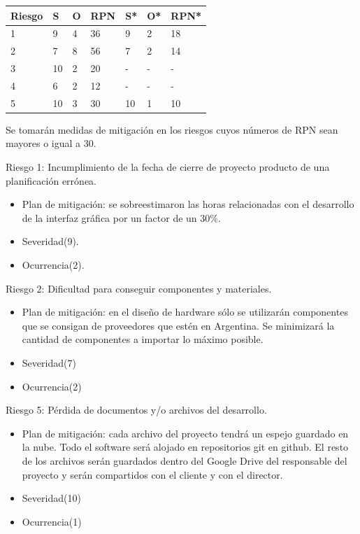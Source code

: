 \documentclass[11pt]{charter}
\begin{document}
\begin{table}[htpb]
\centering
\begin{tabularx}{\linewidth}{@{}|X|X|X|X|X|X|X|@{}}
\hline
\rowcolor[HTML]{C0C0C0} 
Riesgo	& S		& O	& RPN	& S*		& O* & RPN* \\ \hline
1 		& 9		& 4	&  36	& 9		& 2  & 18	\\ \hline
2		& 7		& 8	&  56	& 7		& 2  & 14	\\ \hline
3		& 10		& 2	&  20	& -		& -  & -		\\ \hline
4		& 6		& 2	&  12	& -		& -  & -		\\ \hline
5		& 10		& 3	&  30	& 10		& 1  & 10	\\ \hline
\end{tabularx}%
\end{table}

Se tomarán medidas de mitigación en los riesgos cuyos números de RPN sean mayores o igual a 30.

Riesgo 1: Incumplimiento de la fecha de cierre de proyecto producto de una planificación errónea.
\begin{itemize}
\item Plan de mitigación: se sobreestimaron las horas relacionadas con el desarrollo de la interfaz gráfica por un factor de un 30\%.
\item Severidad(9).
\item Ocurrencia(2).
\end{itemize}  

Riesgo 2: Dificultad para conseguir componentes y materiales.
\begin{itemize}
\item Plan de mitigación: en el diseño de hardware sólo se utilizarán componentes que se consigan de proveedores que estén en Argentina. Se minimizará la cantidad de componentes a importar lo máximo posible.
\item Severidad(7)
\item Ocurrencia(2)
\end{itemize}

Riesgo 5: Pérdida de documentos y/o archivos del desarrollo.
\begin{itemize}
\item Plan de mitigación: cada archivo del proyecto tendrá un espejo guardado en la nube. Todo el software será alojado en repositorios git en github. El resto de los archivos serán guardados dentro del Google Drive del responsable del proyecto y serán compartidos con el cliente y con el director.
\item Severidad(10)
\item Ocurrencia(1)
\end{itemize}
\end{document}
